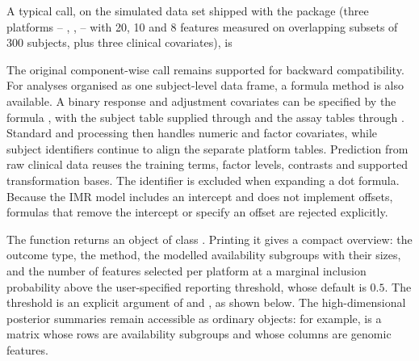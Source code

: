 \documentclass[article]{jss}
\begin{document}
A typical call, on the simulated data set  shipped with the
package (three platforms -- , ,
 -- with 20, 10 and 8 features measured on overlapping subsets
of 300 subjects, plus three clinical covariates), is

\begin{CodeChunk}
\end{CodeChunk}

The original component-wise call remains supported for backward compatibility.
For analyses organised as one subject-level data frame, a formula method is
also available.  A binary response and adjustment covariates can be specified
by the formula , with the subject
table supplied through  and the assay tables through
. Standard  and
 processing then handles numeric and factor covariates,
while subject identifiers continue to align the separate platform tables.
Prediction from raw clinical data reuses the training terms, factor levels,
contrasts and supported transformation bases. The identifier is excluded when
expanding a dot formula. Because the IMR model includes an intercept and does
not implement offsets, formulas that remove the intercept or specify an offset
are rejected explicitly.

The function returns an object of class . Printing it gives a
compact overview: the outcome type, the method, the modelled availability
subgroups with their sizes, and the number of features selected per platform at
a marginal inclusion probability above the user-specified
reporting threshold, whose default is $0.5$.  The threshold is an explicit
argument of  and , as shown below.
The high-dimensional posterior summaries remain accessible as ordinary
 objects: for example,  is a matrix whose
rows are availability subgroups and whose columns are genomic features.
\end{document}
